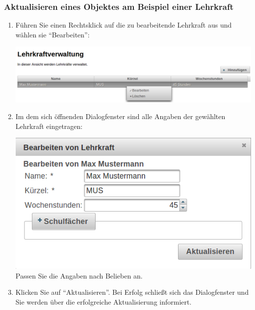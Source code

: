 \documentclass[fontsize=12pt]{scrartcl}
\begin{document}
\subsubsection{Aktualisieren eines Objektes am Beispiel einer Lehrkraft}

\begin{enumerate}
\item Führen Sie einen Rechtsklick auf die zu bearbeitende Lehrkraft aus und wählen sie "`Bearbeiten"': \medskip\\
	\begin{minipage}[t]{\linewidth}
            \includegraphics[width=1\linewidth]{images/editTeacher.png}
    \end{minipage}
\item Im dem sich öffnenden Dialogfenster sind alle Angaben der gewählten Lehrkraft eingetragen: \medskip\\
	\begin{minipage}[t]{\linewidth}
            \includegraphics[width=.8\linewidth]{images/editTeacherDialog.png}
    \medskip\\ Passen Sie die Angaben nach Belieben an.
    \end{minipage}
\item Klicken Sie auf "`Aktualisieren"'. Bei Erfolg schließt sich das Dialogfenster und Sie werden über die erfolgreiche Aktualisierung informiert. %
\end{enumerate}
\end{document}
